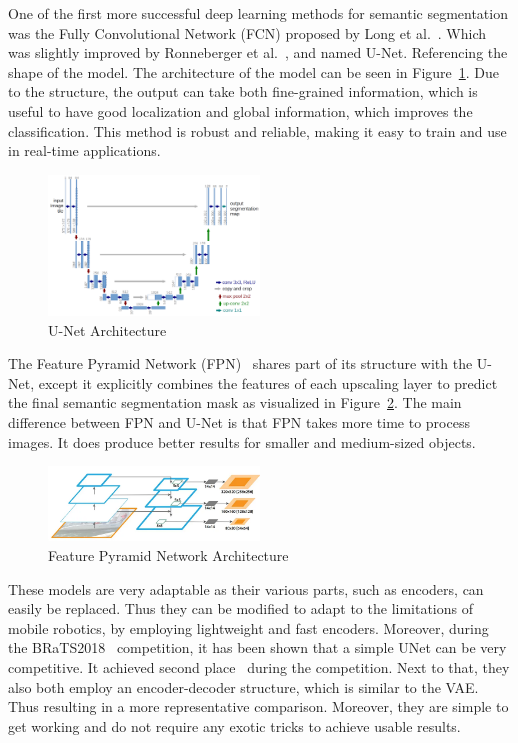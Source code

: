 One of the first more successful deep learning methods for semantic segmentation was the Fully Convolutional Network (FCN) proposed by Long et al.~\cite{long2015fully}. Which was slightly improved by Ronneberger et al.~\cite{ronneberger2015u}, and named U-Net. Referencing the shape of the model. The architecture of the model can be seen in Figure~\ref{fig:unet-architecture}. Due to the structure, the output can take both fine-grained information, which is useful to have good localization and global information, which improves the classification. This method is robust and reliable, making it easy to train and use in real-time applications.
\begin{figure}[ht]
    \centering
    \includegraphics[width=0.5\textwidth]{figures/unet-architecture.png}
    \caption{U-Net Architecture~\cite{ronneberger2015u}}
    \label{fig:unet-architecture}
\end{figure}

The Feature Pyramid Network (FPN)~\cite{lin2017feature} shares part of its structure with the U-Net, except it explicitly combines the features of each upscaling layer to predict the final semantic segmentation mask as visualized in Figure~\ref{fig:fpn-architecture}. The main difference between FPN and U-Net is that FPN takes more time to process images. It does produce better results for smaller and medium-sized objects.

\begin{figure}[ht]
    \centering
    \includegraphics[width=0.5\textwidth]{figures/fpn-architecture.png}
    \caption{Feature Pyramid Network Architecture~\cite{lin2017feature}}
    \label{fig:fpn-architecture}
\end{figure}

These models are very adaptable as their various parts, such as encoders, can easily be replaced. Thus they can be modified to adapt to the limitations of mobile robotics, by employing lightweight and fast encoders. Moreover, during the BRaTS2018~\cite{menze2014multimodal} competition, it has been shown that a simple UNet can be very competitive. It achieved second place~\cite{DBLP:journals/corr/abs-1809-10483} during the competition. Next to that, they also both employ an encoder-decoder structure, which is similar to the VAE. Thus resulting in a more representative comparison. Moreover, they are simple to get working and do not require any exotic tricks to achieve usable results.
